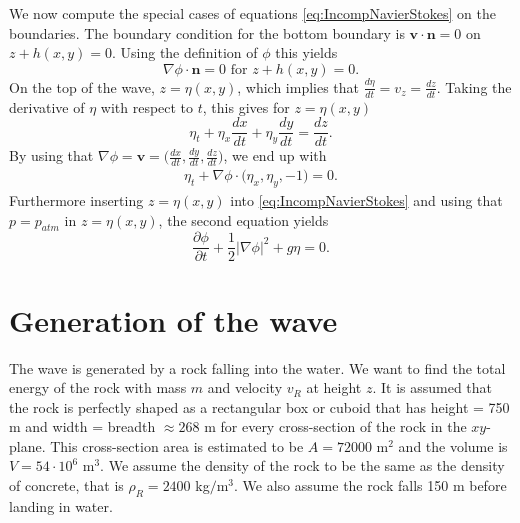 \documentclass[11pt]{article}
\begin{document}
We now compute the special cases of equations \eqref{eq:IncompNavierStokes} on the boundaries. 
The boundary condition for the bottom boundary is $\bm{v} \cdot \bm{n} = 0 $ on $z + h(x,y) = 0$. Using the definition of $\phi$ this yields
\begin{equation}
    \label{eq:phit}%
    \nabla \phi  \cdot \bm{n} = 0 \text{ for } z + h(x,y) = 0. 
\end{equation}
On the top of the wave, $z = \eta(x,y)$, which implies that $\frac{d\eta}{dt} = v_z = \frac{dz}{dt}$. Taking the derivative of $\eta$ with respect to $t$, this gives for $z = \eta(x,y)$
\begin{equation*}
    \eta_t + \eta_x\frac{dx}{dt} + \eta_y\frac{dy}{dt} = \frac{dz}{dt}. 
\end{equation*}
By using that $\nabla\phi = \bm{v} = \Big(\frac{dx}{dt}, \frac{dy}{dt}, \frac{dz}{dt}\Big)$, we end up with
\begin{align}
    \label{eq:etaEq}%
    \eta_t + \nabla\phi\cdot \big(\eta_x, \eta_y, - 1\big) = 0.
\end{align}
Furthermore inserting $z = \eta(x,y)$ into \eqref{eq:IncompNavierStokes} and using that $p = p_{atm}$ in $z = \eta(x,y)$, the second equation yields
\begin{equation}
    \label{eq:phiEq}
    \frac{\partial \phi }{\partial t} + \frac{1}{2}|\nabla \phi |^2 + g\eta = 0.
\end{equation}
%
%
\section{Generation of the wave}
The wave is generated by a rock falling into the water. We want to find the total energy of the rock with mass $m$ and velocity $v_R$ at height $z$. It is assumed that the rock is
perfectly shaped as a rectangular box or cuboid that has height = 750 m and  width = breadth $\approx 268$ m for every cross-section of the rock in the $xy$-plane. This cross-section area
is estimated to be  $A=72000$ m$^2$ and the volume is $V= 54 \cdot 10^6$ m$^3$. We assume the density of the rock to be the same as the density of concrete, that is $\rho_{R}=2400$ kg$/$m$^3$.
We also assume the rock falls 150 m before landing in water.
\end{document}
